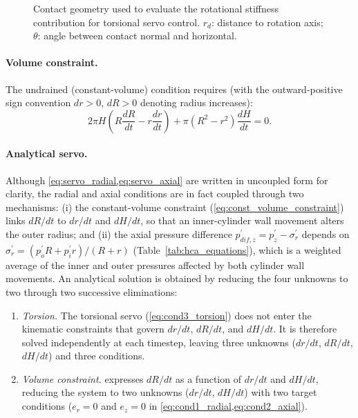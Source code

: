 \begin{figure}[t]
  \centering
  \caption{Contact geometry used to evaluate the rotational stiffness contribution for torsional servo control. $r_d$: distance to rotation axis; $\theta$: angle between contact normal and horizontal.}
  \label{fig:servo_geometry}
\end{figure}

\paragraph{Volume constraint.}
The undrained (constant-volume) condition requires (with the outward-positive sign convention $dr>0$, $dR>0$ denoting radius increases):
\begin{equation}
2\pi H\!\left(R\frac{dR}{dt} - r\frac{dr}{dt}\right) + \pi\!\left(R^2-r^2\right)\frac{dH}{dt} = 0.
\label{eq:const_volume_constraint}
\end{equation}

\paragraph{Analytical servo.}
Although \cref{eq:servo_radial,eq:servo_axial} are written in uncoupled form for clarity, the radial and axial conditions are in fact coupled through two mechanisms: (i) the constant-volume constraint (\cref{eq:const_volume_constraint}) links $dR/dt$ to $dr/dt$ and $dH/dt$, so that an inner-cylinder wall movement alters the outer radius; and (ii) the axial pressure difference $p_{dif,z}^{\prime}=p_z^{\prime}-\sigma_r^{\prime}$ depends on $\sigma_r^{\prime}=({p_o^{\prime}R+p_i^{\prime}r})/({R+r})$ (Table~\ref{tab:hca_equations}), which is a weighted average of the inner and outer pressures affected by both cylinder wall movements. An analytical solution is obtained by reducing the four unknowns to two through two successive eliminations:
\begin{enumerate}
\item \emph{Torsion.} The torsional servo (\cref{eq:cond3_torsion}) does not enter the kinematic constraints that govern $dr/dt$, $dR/dt$, and $dH/dt$. It is therefore solved independently at each timestep, leaving three unknowns ($dr/dt$, $dR/dt$, $dH/dt$) and three conditions.
\item \emph{Volume constraint.}  expresses $dR/dt$ as a function of $dr/dt$ and $dH/dt$, reducing the system to two unknowns ($dr/dt$, $dH/dt$) with two target conditions ($e_r=0$ and $e_z=0$ in \cref{eq:cond1_radial,eq:cond2_axial}).
\end{enumerate}

